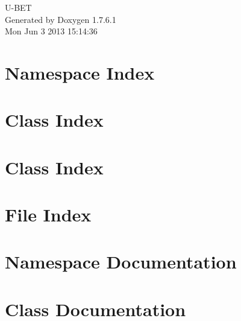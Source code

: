 \documentclass[a4paper]{book}
\begin{document}
\hypersetup{pageanchor=false,citecolor=blue}
\begin{titlepage}
\vspace*{7cm}
\begin{center}
{\Large \-U-\/\-B\-E\-T }\\
\vspace*{1cm}
{\large \-Generated by Doxygen 1.7.6.1}\\
\vspace*{0.5cm}
{\small Mon Jun 3 2013 15:14:36}\\
\end{center}
\end{titlepage}
\clearemptydoublepage
{}
\tableofcontents
\clearemptydoublepage
{}
\hypersetup{pageanchor=true,citecolor=blue}
\chapter{\-Namespace \-Index}

\chapter{\-Class \-Index}

\chapter{\-Class \-Index}

\chapter{\-File \-Index}

\chapter{\-Namespace \-Documentation}

\chapter{\-Class \-Documentation}





























\end{document}
